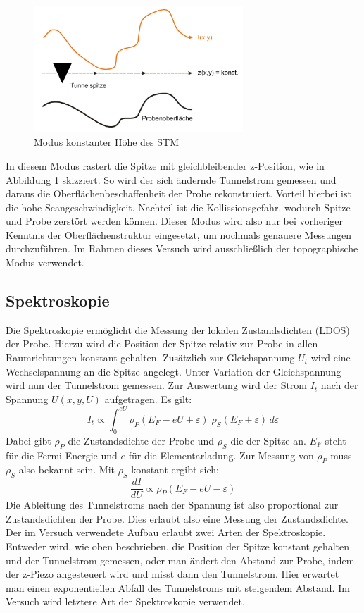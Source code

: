 \begin{figure}[h]
    \centering
    \includegraphics[width=0.7\textwidth]{Abb/konst.png}
    \caption{Modus konstanter Höhe des STM \cite{beschr}}
    \label{konst}
\end{figure}
In diesem Modus rastert die Spitze mit gleichbleibender z-Position, wie in Abbildung
\ref{konst} skizziert. So wird der
sich ändernde Tunnelstrom gemessen und daraus die Oberflächenbeschaffenheit der 
Probe rekonstruiert. Vorteil hierbei ist die hohe Scangeschwindigkeit. Nachteil
ist die Kollissionsgefahr, wodurch Spitze und Probe zerstört werden können. Dieser
Modus wird also nur bei vorheriger Kenntnis der Oberflächenstruktur eingesetzt, um 
nochmals genauere Messungen durchzuführen. Im Rahmen dieses Versuch wird 
ausschließlich der topographische Modus verwendet.

    \subsection{Spektroskopie}
    \label{spek}

Die Spektroskopie ermöglicht die Messung der lokalen Zustandsdichten (LDOS) der
Probe. Hierzu wird die Position der Spitze relativ zur Probe in allen Raumrichtungen
konstant gehalten. Zusätzlich zur Gleichspannung $U_t$ wird eine Wechselspannung an 
die Spitze angelegt. Unter Variation der Gleichspannung wird nun der Tunnelstrom
gemessen. Zur Auswertung wird der Strom $I_t$ nach der Spannung $U(x,y,U)$ 
aufgetragen. Es gilt:
\[
    I_t \propto \int_0^{eU} \rho_P (E_F - eU + \varepsilon) \; 
                            \rho_S (E_F + \varepsilon) \, d \varepsilon
\]
Dabei gibt $\rho_P$ die Zustandsdichte der Probe und $\rho_S$ die der Spitze an.
$E_F$ steht für die Fermi-Energie und $e$ für die Elementarladung.
Zur Messung von $\rho_P$ muss $\rho_S$ also bekannt sein. Mit $\rho_S$ konstant
ergibt sich:
\[
    \frac{dI}{dU} \propto \rho_P (E_F - eU - \varepsilon)
\]
Die Ableitung des Tunnelstroms nach der Spannung ist also proportional zur 
Zustandsdichten der Probe. Dies erlaubt also eine Messung der Zustandsdichte.
Der im Versuch verwendete Aufbau erlaubt zwei Arten der Spektroskopie. Entweder
wird, wie oben beschrieben, die Position der Spitze konstant gehalten und der 
Tunnelstrom gemessen, oder man ändert den Abstand zur Probe, indem der z-Piezo
angesteuert wird und misst dann den Tunnelstrom. Hier erwartet man einen 
exponentiellen Abfall des Tunnelstroms mit steigendem Abstand. Im Versuch wird
letztere Art der Spektroskopie verwendet.
\cite{beschr}

